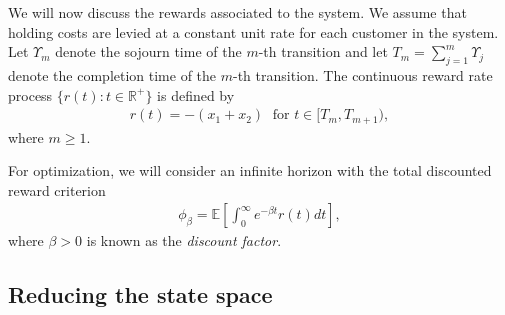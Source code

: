 \documentclass{article}
\theoremstyle{definition}
\theoremstyle{plain}
\begin{document}
We will now discuss the rewards associated to the system. We assume that holding
costs are levied at a constant unit rate for each customer in the system. Let
$\Upsilon_{m}$ denote the sojourn time of the $m$-th transition and let
$T_{m} = \sum_{j=1}^{m} \Upsilon_{j}$ denote the completion time of the $m$-th transition.
The continuous reward rate process $\{ r(t) : t \in \mathbb{R}^{+} \}$ is
defined by
\begin{align}
  r(t) = - (x_{1} + x_{2}) \; \text{ for } t \in [ T_{m}, T_{m+1} ) ,
\end{align}
where $m \geq 1$.

For optimization, we will consider an infinite horizon with the total discounted
reward criterion
\begin{align}
  \label{eq:criterion}
  \phi_{\beta} = \mathbb{E} \left[ \int_{0}^{\infty} e^{-\beta t} r(t) dt \right] ,
\end{align}
where $\beta > 0$ is known as the \textit{discount factor}.


\subsection{Reducing the state space}
\label{sec:reduced-model}
\end{document}
